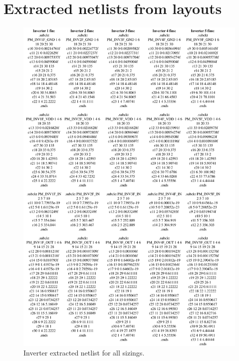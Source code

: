 \documentclass[pgmicro,mestrado,english]{iiufrgs}
\begin{document}
\chapter{Extracted netlists from layouts}

\addtolength{\oddsidemargin}{.875in}
\addtolength{\evensidemargin}{.875in}
\addtolength{\textwidth}{-1.75in}

\begin{figure}[]
\centering
\includegraphics[width=\textwidth]{extsINV.pdf}
\caption{Inverter extracted netlist for all sizings.}
\label{fig:extsINV}
\end{figure}
\end{document}
